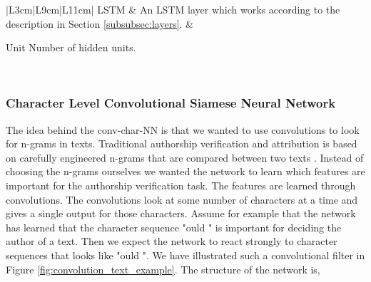 \begin{landscape}
\begin{table}
\begin{tabular}{|L{3cm}|L{9cm}|L{11cm}|}
            \gls{LSTM}                                                         &
            An \glsdesc{LSTM} layer which works according to the description in
            Section \ref{subsubsec:layers}.                                    &
            \begin{minipage}[t]{\linewidth}
            \begin{compactdesc}
                \item[Unit] Number of hidden units.
            \end{compactdesc}
            \end{minipage}                                                    \\
            \hline
        \end{tabular}
        \caption{Glossary used when performing experiments, and creating their
            associated models \citep{chollet2015keras}.}
        \label{tab:glossary}
    \end{table}
\end{landscape}


\subsubsection{Character Level Convolutional Siamese Neural Network}
\label{subsubsec:conv_char_nn}

The idea behind the \gls{conv-char-NN} is that we wanted to use convolutions to
look for n-grams in texts. Traditional authorship verification and attribution
is based on carefully engineered n-grams that are compared between two texts
\citep{stamatos2009}. Instead of choosing the n-grams ourselves we wanted the
network to learn which features are important for the authorship verification
task. The features are learned through convolutions. The convolutions look
at some number of characters at a time and gives a single output for those
characters. Assume for example that the network has learned that the character
sequence "ould " is important for deciding the author of a text. Then we
expect the network to react strongly to character sequences that looks
like "ould ". We have illustrated such a convolutional filter in Figure
\ref{fig:convolution_text_example}. The structure of the network is,

